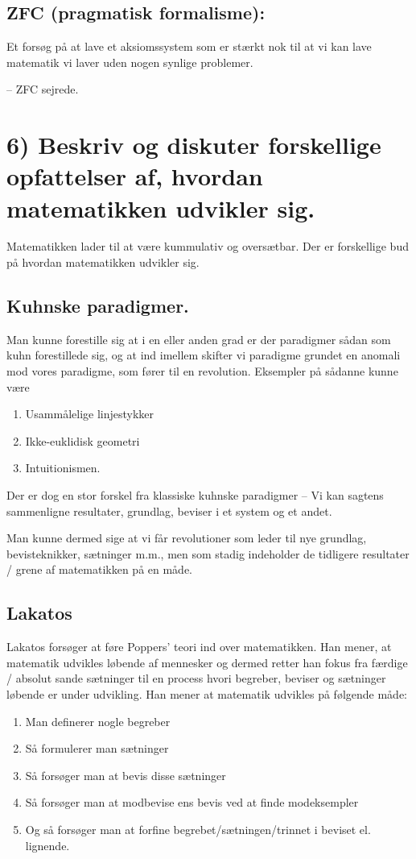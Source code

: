 \documentclass[a4paper,oneside,12pt]{memoir}
\begin{document}
\subsection{ZFC (pragmatisk formalisme):}
Et forsøg på at lave et aksiomssystem som er stærkt nok til at vi kan lave matematik vi laver uden nogen synlige problemer.

-- ZFC sejrede.

\newpage
\section{6) Beskriv og diskuter forskellige opfattelser af, hvordan matematikken udvikler sig.}
Matematikken lader til at være kummulativ og oversætbar. Der er forskellige bud på hvordan matematikken udvikler sig.

\subsection{Kuhnske paradigmer.}
Man kunne forestille sig at i en eller anden grad er der paradigmer sådan som kuhn forestillede sig, og at ind imellem skifter vi paradigme grundet en anomali mod vores paradigme, som fører til en revolution. Eksempler på sådanne kunne være
\begin{enumerate}
\item Usammålelige linjestykker
\item Ikke-euklidisk geometri
\item Intuitionismen.
\end{enumerate}
Der er dog en stor forskel fra klassiske kuhnske paradigmer -- Vi kan sagtens sammenligne resultater, grundlag, beviser i et system og et andet. 

Man kunne dermed sige at vi får revolutioner som leder til nye grundlag, bevisteknikker, sætninger m.m., men som stadig indeholder de tidligere resultater / grene af matematikken på en måde.

\subsection{Lakatos}
Lakatos forsøger at føre Poppers' teori ind over matematikken. Han mener, at matematik udvikles løbende af mennesker og dermed retter han fokus fra færdige / absolut sande sætninger til en process hvori begreber, beviser og sætninger løbende er under udvikling. Han mener at matematik udvikles på følgende måde:
\begin{enumerate}
\item Man definerer nogle begreber
\item Så formulerer man sætninger
\item Så forsøger man at bevis disse sætninger
\item Så forsøger man at modbevise ens bevis ved at finde modeksempler
\item Og så forsøger man at forfine begrebet/sætningen/trinnet i beviset el. lignende.
\end{enumerate}
\end{document}
